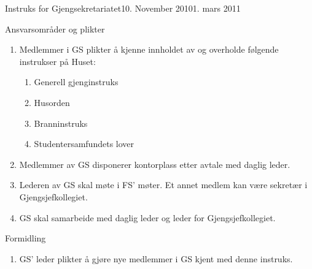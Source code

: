 \begin{instruks}{Instruks for Gjengsekretariatet}{10. November 2010}{1. mars 2011}
    \begin{instruksledd}{Ansvarsområder og plikter}
        \begin{enumerate}
            \item Medlemmer i GS plikter å kjenne innholdet av og overholde følgende instrukser på Huset:
                \begin{enumerate}
                    \item Generell gjenginstruks
                    \item Husorden
                    \item Branninstruks
                    \item Studentersamfundets lover
                \end{enumerate}
            \item Medlemmer av GS disponerer kontorplass etter avtale med daglig leder.
            \item Lederen av GS skal møte i FS' møter. Et annet medlem kan være sekretær i
Gjengsjefkollegiet.
            \item GS skal samarbeide med daglig leder og leder for Gjengsjefkollegiet.
        \end{enumerate}
    \end{instruksledd}

    \begin{instruksledd}{Formidling}
        \begin{enumerate}
            \item GS' leder plikter å gjøre nye medlemmer i GS kjent med denne instruks.
        \end{enumerate}
    \end{instruksledd}


\end{instruks}
